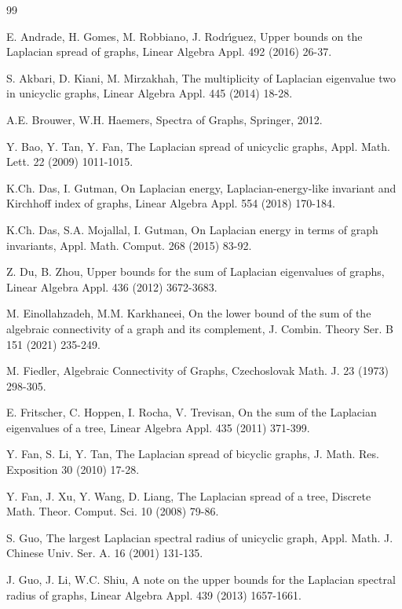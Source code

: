 \documentclass[12pt, a4paper]{article}
\begin{document}
\small {
\begin{thebibliography}{99}


 E. Andrade, H. Gomes, M. Robbiano, J. Rodr\'{\i}guez, Upper bounds on the Laplacian spread of graphs, Linear Algebra Appl. 492 (2016) 26-37.

 S. Akbari, D. Kiani, M. Mirzakhah, The multiplicity of Laplacian eigenvalue two in unicyclic graphs, Linear Algebra Appl. 445 (2014) 18-28.

 A.E. Brouwer, W.H. Haemers, Spectra of Graphs, Springer, 2012.%

 Y. Bao, Y. Tan, Y. Fan, The Laplacian spread of unicyclic graphs, Appl. Math. Lett. 22 (2009) 1011-1015.

 K.Ch. Das, I. Gutman, On Laplacian energy, Laplacian-energy-like invariant and Kirchhoff index of graphs, Linear Algebra Appl. 554 (2018) 170-184.%

 K.Ch. Das, S.A. Mojallal, I. Gutman, On Laplacian energy in terms of graph invariants, Appl. Math. Comput. 268 (2015) 83-92.

 Z. Du, B. Zhou, Upper bounds for the sum of Laplacian eigenvalues of graphs, Linear Algebra Appl. 436 (2012) 3672-3683.

 M. Einollahzadeh, M.M. Karkhaneei, On the lower bound of the sum of the algebraic connectivity of a graph and its complement, J. Combin. Theory Ser. B 151 (2021) 235-249.

 M. Fiedler, Algebraic Connectivity of Graphs, Czechoslovak Math. J. 23 (1973) 298-305.%

 E. Fritscher, C. Hoppen, I. Rocha, V. Trevisan, On the sum of the Laplacian eigenvalues of a tree, Linear Algebra Appl. 435 (2011) 371-399.%

 Y. Fan, S. Li, Y. Tan, The Laplacian spread of bicyclic graphs, J. Math. Res. Exposition 30 (2010) 17-28.%

 Y. Fan, J. Xu, Y. Wang, D. Liang, The Laplacian spread of a tree, Discrete Math. Theor. Comput. Sci. 10 (2008) 79-86.%

 S. Guo, The largest Laplacian spectral radius of unicyclic graph, Appl. Math. J. Chinese Univ. Ser. A. 16 (2001) 131-135.%

 J. Guo, J. Li, W.C. Shiu, A note on the upper bounds for the Laplacian spectral radius of graphs, Linear Algebra Appl. 439 (2013) 1657-1661.%


\end{thebibliography}}
\end{document}
